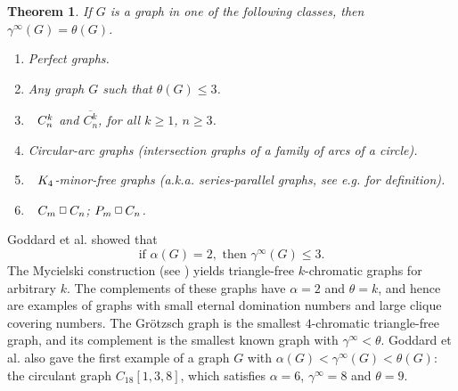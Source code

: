 \documentclass[12pt]{article}%
\newtheorem{theorem}{Theorem}[section]
\providecommand{\boksie}{\ensuremath{\mathbin{\raisebox{0.3mm}{$\scriptstyle\square$}}}}
\begin{document}
\begin{theorem}
If $G$ is a graph in one of the following classes, then $\gamma^{\infty
}(G)=\theta(G)$.

\begin{enumerate}
\item[\emph{(a)}] \emph{\cite{BCG2}}\hspace{0.1in}Perfect graphs.

\item[\emph{(b)}] \emph{\cite{BCG2}}\hspace{0.1in}Any graph $G$ such that
$\theta(G)\leq3$.

\item[\emph{(c)}] \emph{\cite{KM2}}$\hspace{0.1in}C_{n}^{k}$ and
$\overline{C_{n}^{k}}$, for all $k\geq1$, $n\geq3$.

\item[\emph{(d)}] \emph{\cite{regan}}\hspace{0.1in}Circular-arc graphs
(intersection graphs of a family of arcs of a circle).

\item[\emph{(e)}] \emph{\cite{ABB}}$\hspace{0.1in}K_{4}$-minor-free graphs
(a.k.a. series-parallel graphs, see e.g. \cite[p. 336]{West} for definition).

\item[\emph{(f)}] \emph{\cite{ABB}}$\hspace{0.1in}C_{m}\boksie C_{n}$;
$P_{m}\boksie C_{n}$.
\end{enumerate}
\end{theorem}

Goddard et al. \cite{GHH} showed that
\begin{equation}
\text{if }\alpha(G)=2,\text{ then }\gamma^{\infty}(G)\leq3.
\label{eq_GHH_Bound}%
\end{equation}
The Mycielski construction (see \cite[p. 203]{CL}) yields triangle-free
$k$-chromatic graphs for arbitrary $k$. The complements of these graphs have
$\alpha=2$ and $\theta=k$, and hence are examples of graphs with small eternal
domination numbers and large clique covering numbers. The Gr\"{o}tzsch graph
is the smallest $4$-chromatic triangle-free graph, and its complement is the
smallest known graph with $\gamma^{\infty}<\theta$. Goddard et al. \cite{GHH}
also gave the first example of a graph $G$ with $\alpha(G)<\gamma^{\infty
}(G)<\theta(G)$: the circulant graph $C_{18}[1,3,8]$, which satisfies
$\alpha=6$, $\gamma^{\infty}=8$ and $\theta=9$.
\end{document}
